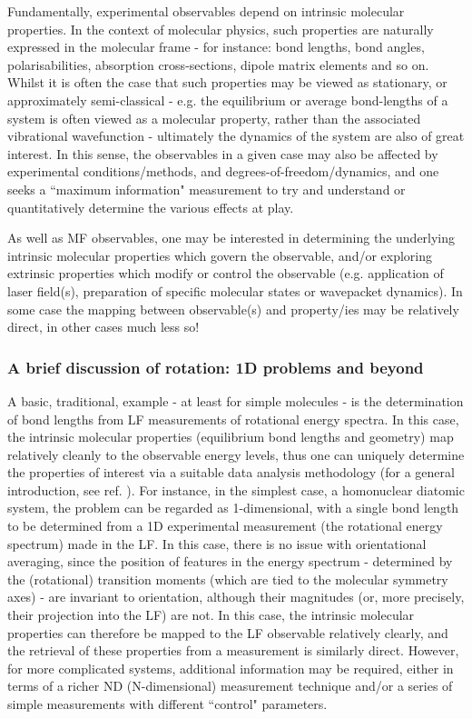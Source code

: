 \documentclass[10pt]{article}
\begin{document}
Fundamentally, experimental observables depend on intrinsic molecular properties. In the  context of molecular physics, such properties are naturally expressed in the molecular frame - for instance: bond lengths, bond angles, polarisabilities, absorption cross-sections, dipole matrix elements and so on. Whilst it is often the case that such properties may be viewed as stationary, or approximately semi-classical - e.g. the equilibrium or average bond-lengths of a system is often viewed as a molecular property, rather than the associated vibrational wavefunction - ultimately the dynamics of the system are also of great interest. In this sense, the observables in a given case may also be affected by experimental conditions/methods, and degrees-of-freedom/dynamics, and one seeks a ``maximum information" measurement to try and understand or quantitatively determine the various effects at play.

As well as MF observables, one may be interested in determining the underlying intrinsic molecular properties which govern the observable, and/or exploring extrinsic properties which modify or control the observable (e.g. application of laser field(s), preparation of specific molecular states or wavepacket dynamics). In some case the mapping between observable(s) and property/ies may be relatively direct, in other cases much less so!

\subsubsection{A brief discussion of rotation: 1D problems and beyond}

A basic, traditional, example - at least for simple molecules - is the determination of bond lengths from LF measurements of rotational energy spectra. In this case, the intrinsic molecular properties (equilibrium bond lengths and geometry) map relatively cleanly to the observable energy levels, thus one can uniquely determine the properties of interest via a suitable data analysis methodology (for a general introduction, see ref. \cite{hollasHighRes}). For instance, in the simplest case, a homonuclear diatomic system, the problem can be regarded as 1-dimensional, with a single bond length to be determined from a 1D experimental measurement (the rotational energy spectrum) made in the LF. In this case, there is no issue with orientational averaging, since the position of features in the energy spectrum - determined by the (rotational) transition moments (which are tied to the molecular symmetry axes) - are invariant to orientation, although their magnitudes (or, more precisely, their projection into the LF) are not. In this case, the intrinsic molecular properties can therefore be mapped to the LF observable relatively clearly, and the retrieval of these properties from a measurement is similarly direct. However, for more complicated systems, additional information may be required, either in terms of a richer ND (N-dimensional) measurement technique and/or a series of simple measurements with different ``control" parameters.
\end{document}

